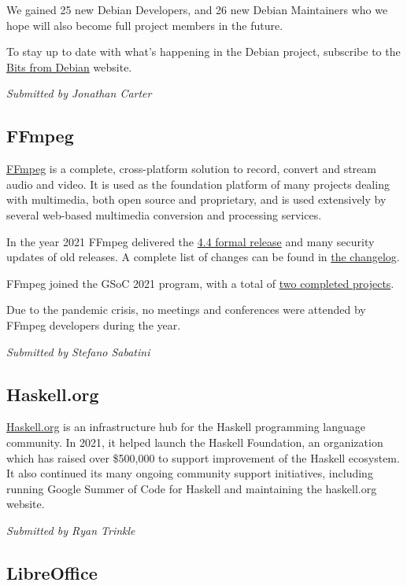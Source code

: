 \documentclass[a4paper]{report}
\begin{document}
We gained 25 new Debian Developers, and 26 new Debian Maintainers who we hope will also become full project members in the future.

To stay up to date with what's happening in the Debian project, subscribe to the \href{http://bits.debian.org/}{Bits from Debian} website.

{\em Submitted by Jonathan Carter}

\subsection{FFmpeg}

\href{https://www.ffmpeg.org/}{FFmpeg} is a complete, cross-platform solution to record, convert and stream audio and video. It is used as the foundation platform of many projects dealing with multimedia, both open source and proprietary, and is used extensively by several web-based multimedia conversion and processing services.

In the year 2021 FFmpeg delivered the \href{https://git.ffmpeg.org/gitweb/ffmpeg.git/blob/refs/heads/release/4.4:/RELEASE_NOTES}{4.4 formal release} and many security updates of old releases. A complete list of changes can be found in \href{https://git.ffmpeg.org/gitweb/ffmpeg.git/blob/HEAD:/Changelog}{the changelog}.

FFmpeg joined the GSoC 2021 program, with a total of \href{https://trac.ffmpeg.org/wiki/SponsoringPrograms/GSoC/2021/Results}{two completed projects}.

Due to the pandemic crisis, no meetings and conferences were attended by FFmpeg developers during the year.

{\em Submitted by Stefano Sabatini}

\subsection{Haskell.org}

\href{https://www.haskell.org/}{Haskell.org} is an infrastructure hub for the Haskell programming language community. In 2021, it helped launch the Haskell Foundation, an organization which has raised over \$500,000 to support improvement of the Haskell ecosystem. It also continued its many ongoing community support initiatives, including running Google Summer of Code for Haskell and maintaining the haskell.org website.

{\em Submitted by Ryan Trinkle}

\subsection{LibreOffice}
\end{document}
